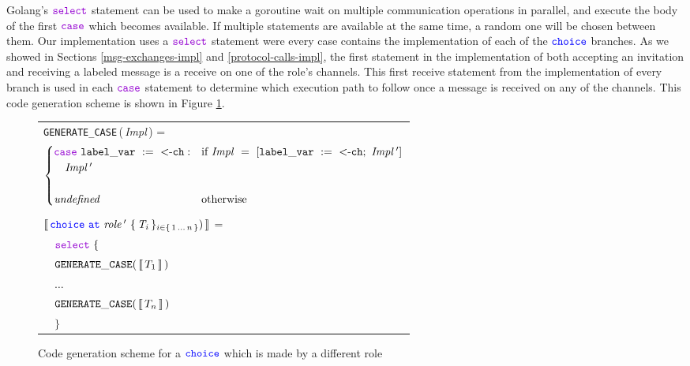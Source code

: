 \documentclass[12pt,twoside]{report}
\begin{document}
Golang's $\goselect$ statement can be used to make a goroutine wait on multiple communication operations in parallel\cite{tourofgo}, and execute the body of the first $\gocase$ which becomes available. If multiple statements are available at the same time, a random one will be chosen between them. Our implementation uses a $\goselect$ statement were every case contains the implementation of each of the ${\color{blue}\mathtt{choice}}$ branches. As we showed in Sections \ref{msg-exchanges-impl} and \ref{protocol-calls-impl}, the first statement in the implementation of both accepting an invitation and receiving a labeled message is a receive on one of the role's channels. This first receive statement from the implementation of every branch is used in each $\gocase$ statement to determine which execution path to follow once a message is received on any of the channels. This code generation scheme is shown in Figure \ref{role-receives-choice-codegen}.

\begin{figure}[!h]
    \begin{center}
        \begin{tabular}{l}
            \texttt{GENERATE\_CASE}\,(\,\textit{Impl}\,) = \\[3pt]
            \begin{math}
                \begin{cases}
                    \gocase\ \assignment{label\_var}{\text{<-}\varname{ch}}: & \text{if}\ \mathit{Impl}\ =\ [\assignment{label\_var}{\text{<-}\varname{ch}};\ \mathit{Impl\,'}]\\
                    \quad \mathit{Impl\,'} & \\\\
                    \mathit{undefined} & \text{otherwise}
                \end{cases}
            \end{math}\\\\[6pt]

            $\llbracket\,{\color{blue}\mathtt{choice}}\ {\color{blue}\mathtt{at}}\ \mathit{role\,'}\ \{\,\mathit{T}_{i}\,\}_{{i \in \{\,1\,\dots\,n\,\}}})\,\rrbracket$ =\\[10pt]
            
            $\quad \goselect\ \{$\\[3pt]

            $\quad \mathtt{GENERATE\_CASE}(\, \llbracket\,T_1\,\rrbracket\,)$\\[6pt]

            $\quad \dots$\\[9pt]
            
            $\quad \mathtt{GENERATE\_CASE}(\, \llbracket\,T_n\,\rrbracket\,)$\\[6pt]
            $\quad \}$\\
        \end{tabular}
    \end{center}
    \caption{Code generation scheme for a ${\color{blue}\mathtt{choice}}$ which is made by a different role}
    \label{role-receives-choice-codegen}
\end{figure}
\end{document}
